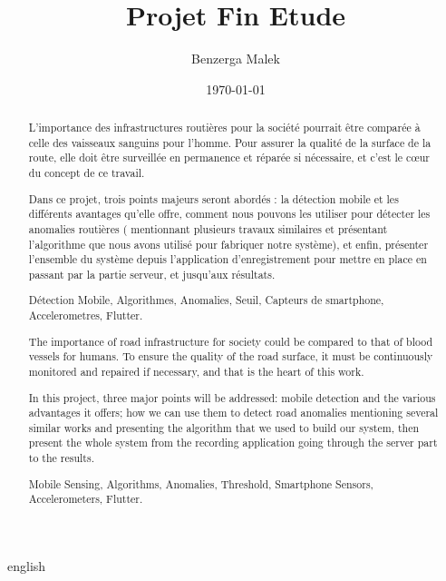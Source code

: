 \documentclass[12pt,a4paper]{report}
\title{Projet Fin Etude}
\author{Benzerga Malek}
\date{\today}
\begin{document}
	\begin{abstract}

        L'importance des infrastructures routières pour la société pourrait être comparée à celle des vaisseaux sanguins pour l'homme. Pour assurer la qualité de la surface de la route, elle doit être surveillée en permanence et réparée si nécessaire, et c'est le cœur du concept de ce travail.

        Dans ce projet, trois points majeurs seront abordés : la détection mobile et les différents avantages qu’elle offre, comment nous pouvons les utiliser pour détecter les anomalies routières ( mentionnant plusieurs travaux similaires et présentant l’algorithme que nous avons utilisé pour fabriquer notre système), et enfin, présenter l’ensemble du système depuis l’application d’enregistrement pour mettre en place en passant par la partie serveur, et jusqu’aux résultats. \newline 




		\begin{keywords}
			Détection Mobile, Algorithmes, Anomalies, Seuil, Capteurs de smartphone, Accelerometres, Flutter.
		\end{keywords}
		

		
		
	\end{abstract}
	
	\begin{selectlanguage}{english}
		
		\begin{abstract}
            
            The importance of road infrastructure for society could be compared to that of blood vessels for humans. To ensure the quality of the road surface, it must be continuously monitored and repaired if necessary, and that is the heart of this work.

            In this project, three major points will be addressed: mobile detection and the various advantages it offers; how we can use them to detect road anomalies mentioning several similar works and presenting the algorithm that we used to build our system, then present the whole system from the recording application going through the server part to the results. \newline 

			\begin{keywordEN}
				Mobile Sensing, Algorithms, Anomalies, Threshold, Smartphone Sensors, Accelerometers, Flutter.\\
				
			\end{keywordEN}
			
		\end{abstract}
    \end{selectlanguage}
	
	
\tableofcontents
\listoffigures








\end{document}
